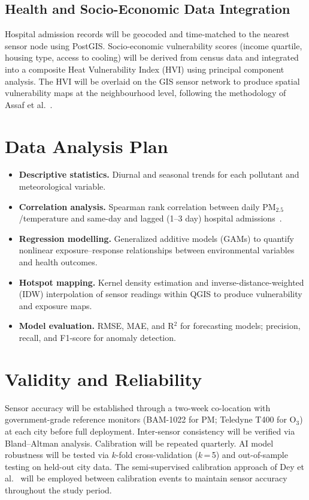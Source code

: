 \subsection{Health and Socio-Economic Data Integration}
Hospital admission records will be geocoded and time-matched to the nearest sensor node using PostGIS. Socio-economic vulnerability scores (income quartile, housing type, access to cooling) will be derived from census data and integrated into a composite Heat Vulnerability Index (HVI) using principal component analysis. The HVI will be overlaid on the GIS sensor network to produce spatial vulnerability maps at the neighbourhood level, following the methodology of Assaf et al.~\cite{assaf2023}.

\section{Data Analysis Plan}
\begin{itemize}[leftmargin=*, itemsep=4pt]
  \item \textbf{Descriptive statistics.} Diurnal and seasonal trends for each pollutant and meteorological variable.
  \item \textbf{Correlation analysis.} Spearman rank correlation between daily PM$_{2.5}$/temperature and same-day and lagged (1--3 day) hospital admissions~\cite{toure2024}.
  \item \textbf{Regression modelling.} Generalized additive models (GAMs) to quantify nonlinear exposure--response relationships between environmental variables and health outcomes.
  \item \textbf{Hotspot mapping.} Kernel density estimation and inverse-distance-weighted (IDW) interpolation of sensor readings within QGIS to produce vulnerability and exposure maps.
  \item \textbf{Model evaluation.} RMSE, MAE, and R$^2$ for forecasting models; precision, recall, and F1-score for anomaly detection.
\end{itemize}

\section{Validity and Reliability}
Sensor accuracy will be established through a two-week co-location with government-grade reference monitors (BAM-1022 for PM; Teledyne T400 for O$_3$) at each city before full deployment. Inter-sensor consistency will be verified via Bland--Altman analysis. Calibration will be repeated quarterly. AI model robustness will be tested via $k$-fold cross-validation ($k$\,=\,5) and out-of-sample testing on held-out city data. The semi-supervised calibration approach of Dey et al.~\cite{dey2022} will be employed between calibration events to maintain sensor accuracy throughout the study period.

